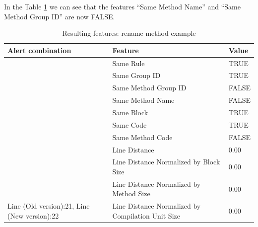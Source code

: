 \documentclass[
]{article}
\begin{document}
\newpage

In the Table \ref{features_rename} we can see that the features ``Same
Method Name'' and ``Same Method Group ID'' are now FALSE.

\small

\begin{table}[!h]

\caption{\label{tab:unnamed-chunk-10}Resulting features: rename method example \label{features_rename} }
\centering
\begin{tabular}[t]{l|l|l}
\hline
Alert combination & Feature & Value\\
\hline
\rowcolor{gray!6}   & Same Rule & TRUE\\

 & Same Group ID & TRUE\\

\rowcolor{gray!6}   & Same Method Group ID & FALSE\\

 & Same Method Name & FALSE\\

\rowcolor{gray!6}   & Same Block & TRUE\\

 & Same Code & TRUE\\

\rowcolor{gray!6}   & Same Method Code & FALSE\\

 & Line Distance & 0.00\\

\rowcolor{gray!6}   & Line Distance Normalized by Block Size & 0.00\\

 & Line Distance Normalized by Method Size & 0.00\\

\multirow[t]{-11}{*}{\raggedright\arraybackslash Line (Old version):21, Line (New version):22} & Line Distance Normalized by Compilation Unit Size & 0.00\\
\hline
\end{tabular}
\end{table}

\normalsize

\newpage
\end{document}
